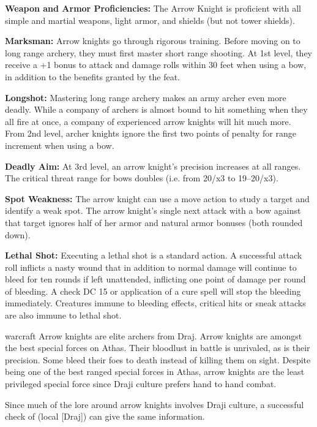 {
\textbf{Weapon and Armor Proficiencies:} The Arrow Knight is proficient with all simple and martial weapons, light armor, and shields (but not tower shields).

\textbf{Marksman:} Arrow knights go through rigorous training. Before moving on to long range archery, they must first master short range shooting. At 1st level, they receive a +1 bonus to attack and damage rolls within 30 feet when using a bow, in addition to the benefits granted by the  feat.

\textbf{Longshot:} Mastering long range archery makes an army archer even more deadly. While a company of archers is almost bound to hit something when they all fire at once, a company of experienced arrow knights will hit much more. From 2nd level, archer knights ignore the first two points of penalty for range increment when using a bow.

\textbf{Deadly Aim:} At 3rd level, an arrow knight's precision increases at all ranges. The critical threat range for bows doubles (i.e. from 20/x3 to 19--20/x3).

\textbf{Spot Weakness:} The arrow knight can use a move action to study a target and identify a weak spot. The arrow knight's single next attack with a bow against that target ignores half of her armor and natural armor bonuses (both rounded down).

\textbf{Lethal Shot:} Executing a lethal shot is a standard action. A successful attack roll inflicts a nasty wound that in addition to normal damage will continue to bleed for ten rounds if left unattended, inflicting one point of damage per round of bleeding. A  check DC 15 or application of a cure spell will stop the bleeding immediately. Creatures immune to bleeding effects, critical hits or sneak attacks are also immune to lethal shot.
}
{}
{warcraft}
{Arrow knights are elite archers from Draj.}
{Arrow knights are amongst the best special forces on Athas. Their bloodlust in battle is unrivaled, as is their precision. Some bleed their foes to death instead of killing them on sight.}
{Despite being one of the best ranged special forces in Athas, arrow knights are the least privileged special force since Draji culture prefers hand to hand combat.}

Since much of the lore around arrow knights involves Draji culture, a successful check of  (local [Draj]) can give the same information.